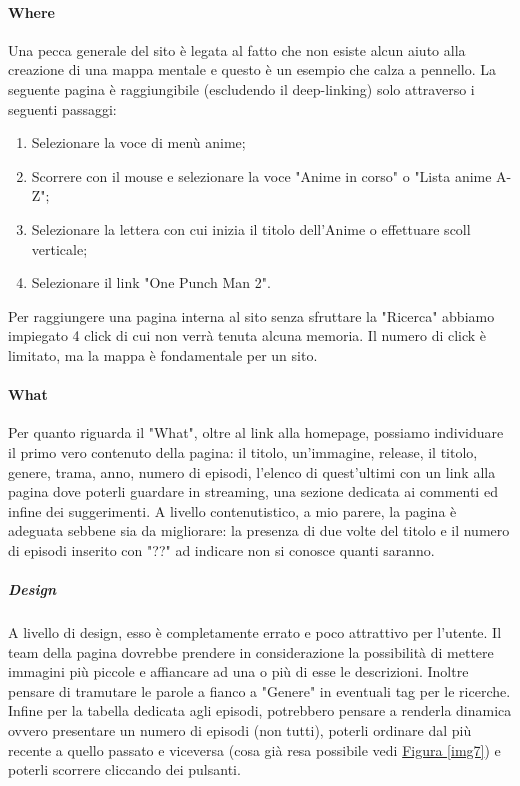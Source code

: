 \paragraph{Where} Una pecca generale del sito è legata al fatto che non esiste alcun aiuto alla creazione di una mappa mentale e questo è un esempio che calza a pennello. La seguente pagina è raggiungibile (escludendo il deep-linking) solo attraverso i seguenti passaggi: 
\begin{enumerate}
	\item Selezionare la voce di menù anime;
	\item Scorrere con il mouse e selezionare la voce "Anime in corso" o "Lista anime A-Z";
	\newpage
	\item Selezionare la lettera con cui inizia il titolo dell'Anime o effettuare scoll verticale;
	\item Selezionare il link "One Punch Man 2". 
\end{enumerate}
Per raggiungere una pagina interna al sito senza sfruttare la "Ricerca" abbiamo impiegato 4 click di cui non verrà tenuta alcuna memoria. Il numero di click è limitato, ma la mappa è fondamentale per un sito.

\paragraph{What} Per quanto riguarda il "What", oltre al link alla homepage, possiamo individuare il primo vero contenuto della pagina: il titolo, un'immagine, release, il titolo, genere, trama, anno, numero di episodi, l'elenco di quest'ultimi con un link alla pagina dove poterli guardare in streaming, una sezione dedicata ai commenti ed infine dei suggerimenti.
A livello contenutistico, a mio parere, la pagina è adeguata sebbene sia da migliorare: la presenza di due volte del titolo e il numero di episodi inserito con "??" ad indicare non si conosce quanti saranno.

\subparagraph{Design} 
A livello di design, esso è completamente errato e poco attrattivo per l'utente. Il team della pagina dovrebbe prendere in considerazione la possibilità di mettere immagini più piccole e affiancare ad una o più di esse le descrizioni. Inoltre pensare di tramutare le parole a fianco a "Genere" in eventuali tag per le ricerche.
Infine per la tabella dedicata agli episodi, potrebbero pensare a renderla dinamica ovvero presentare un numero di episodi (non tutti), poterli ordinare dal più recente a quello passato e viceversa (cosa già resa possibile vedi \hyperref[img7]{Figura \ref{img7}}) e poterli scorrere cliccando dei pulsanti.

